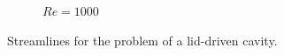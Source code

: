 \begin{figure}[H]
\begin{subfigure}[t]{0.438\textwidth}
        \caption*{$Re = 1000$ \parencite{ghia_1982}}
    \end{subfigure}
    \caption[Streamline results]{Streamlines for the problem of a lid-driven cavity.}
    \label{fig:cavity_streamline}
\end{figure}